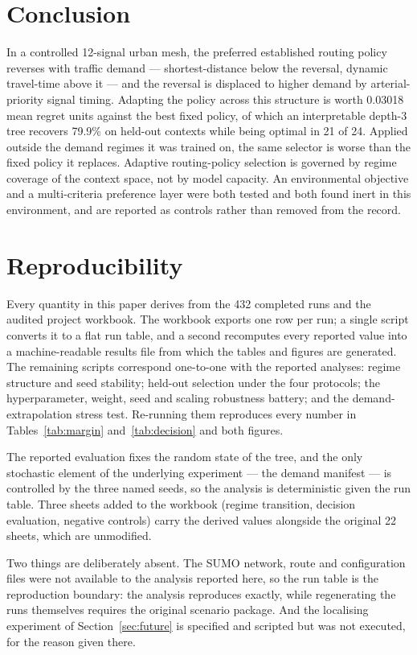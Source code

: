 \documentclass[10pt,a4paper]{article}
\begin{document}
\section{Conclusion}
In a controlled 12-signal urban mesh, the preferred established routing policy reverses with traffic demand --- shortest-distance below the reversal, dynamic travel-time above it --- and the reversal is displaced to higher demand by arterial-priority signal timing. Adapting the policy across this structure is worth 0.03018 mean regret units against the best fixed policy, of which an interpretable depth-3 tree recovers 79.9\% on held-out contexts while being optimal in 21 of 24. Applied outside the demand regimes it was trained on, the same selector is worse than the fixed policy it replaces. Adaptive routing-policy selection is governed by regime coverage of the context space, not by model capacity. An environmental objective and a multi-criteria preference layer were both tested and both found inert in this environment, and are reported as controls rather than removed from the record.

\section{Reproducibility}
Every quantity in this paper derives from the 432 completed runs and the audited project workbook. The workbook exports one row per run; a single script converts it to a flat run table, and a second recomputes every reported value into a machine-readable results file from which the tables and figures are generated. The remaining scripts correspond one-to-one with the reported analyses: regime structure and seed stability; held-out selection under the four protocols; the hyperparameter, weight, seed and scaling robustness battery; and the demand-extrapolation stress test. Re-running them reproduces every number in Tables~\ref{tab:margin} and~\ref{tab:decision} and both figures.

The reported evaluation fixes the random state of the tree, and the only stochastic element of the underlying experiment --- the demand manifest --- is controlled by the three named seeds, so the analysis is deterministic given the run table. Three sheets added to the workbook (regime transition, decision evaluation, negative controls) carry the derived values alongside the original 22 sheets, which are unmodified.

Two things are deliberately absent. The SUMO network, route and configuration files were not available to the analysis reported here, so the run table is the reproduction boundary: the analysis reproduces exactly, while regenerating the runs themselves requires the original scenario package. And the localising experiment of Section~\ref{sec:future} is specified and scripted but was not executed, for the reason given there.
\end{document}
